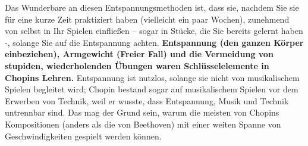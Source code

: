 Das Wunderbare an diesen Entspannungsmethoden ist, dass sie, nachdem Sie sie für eine kurze Zeit praktiziert haben (vielleicht ein paar Wochen), zunehmend von selbst in Ihr Spielen einfließen -- sogar in Stücke, die Sie bereits gelernt haben -, solange Sie auf die Entspannung achten.
\textbf{Entspannung (den ganzen Körper einbeziehen), Armgewicht (Freier Fall) und die Vermeidung von stupiden, wiederholenden Übungen waren Schlüsselelemente in Chopins Lehren.}
Entspannung ist nutzlos, solange sie nicht von musikalischem Spielen begleitet wird; Chopin bestand sogar auf musikalischem Spielen vor dem Erwerben von Technik, weil er wusste, dass Entspannung, Musik und Technik untrennbar sind.
Das mag der Grund sein, warum die meisten von Chopins Kompositionen (anders als die von Beethoven) mit einer weiten Spanne von Geschwindigkeiten gespielt werden können.



